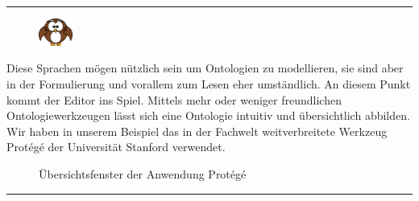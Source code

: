 \noindent\rule[1ex]{\textwidth}{1pt}
\begin{figure}
    \vspace{-19pt}
    \includegraphics[width=0.1\textwidth]{bilder/owl.png}
\end{figure}
Diese Sprachen mögen nützlich sein um Ontologien zu modellieren, sie sind aber in der Formulierung und vorallem zum Lesen eher umständlich. An diesem Punkt kommt der Editor ins Spiel. Mittels mehr oder weniger freundlichen Ontologiewerkzeugen lässt sich eine Ontologie intuitiv und übersichtlich abbilden. Wir haben in unserem Beispiel das in der Fachwelt weitverbreitete Werkzeug Protégé der Universität Stanford verwendet.

\begin{figure}[H]
\centering {}
\caption{Übersichtsfenster der Anwendung Protégé\label{fig:protege}\protect\footnotemark}
\end{figure}
\noindent\rule[1ex]{\textwidth}{1pt}

